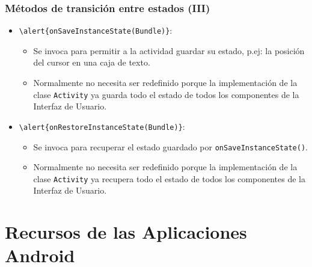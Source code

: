 \documentclass[hyperref={pdfpagelabels=true},ucs]{beamer}
\begin{document}
\begin{frame}[fragile]
\frametitle{Métodos de transición entre estados (III)}

\begin{itemize}
\item \Verb|\alert{onSaveInstanceState(Bundle)}|:
  \begin{itemize}
  \item Se invoca para permitir a la actividad guardar su estado,
    p.ej: la posición del cursor en una caja de texto.
  \item Normalmente no necesita ser redefinido porque la
    implementación de la clase \verb|Activity| ya guarda todo el
    estado de todos los componentes de la Interfaz de Usuario.
  \end{itemize}
\item \Verb|\alert{onRestoreInstanceState(Bundle)}|: 
  \begin{itemize}
  \item Se invoca para recuperar el estado guardado por
    \verb|onSaveInstanceState()|.
  \item Normalmente no necesita ser redefinido porque la
    implementación de la clase \verb|Activity| ya recupera todo el
    estado de todos los componentes de la Interfaz de Usuario.
  \end{itemize}
\end{itemize}

\end{frame}






\section{Recursos de las Aplicaciones Android}
\end{document}
